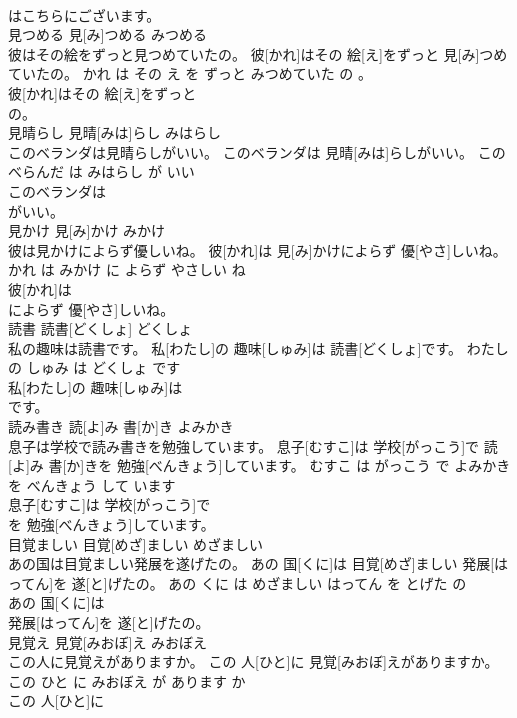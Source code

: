 \documentclass[8pt]{extreport}
\begin{document}
\begin{CJK}{UTF8}{min}
\\	はこちらにございます。			
\\	見つめる	見[み]つめる	みつめる	
\\	彼はその絵をずっと見つめていたの。	彼[かれ]はその 絵[え]をずっと 見[み]つめていたの。	かれ は その え を ずっと みつめていた の 。	
\\	彼[かれ]はその 絵[え]をずっと
\\	の。			
\\	見晴らし	見晴[みは]らし	みはらし	
\\	このベランダは見晴らしがいい。	このベランダは 見晴[みは]らしがいい。	この べらんだ は みはらし が いい	
\\	このベランダは
\\	がいい。			
\\	見かけ	見[み]かけ	みかけ	
\\	彼は見かけによらず優しいね。	彼[かれ]は 見[み]かけによらず 優[やさ]しいね。	かれ は みかけ に よらず やさしい ね	
\\	彼[かれ]は
\\	によらず 優[やさ]しいね。			
\\	読書	読書[どくしょ]	どくしょ	
\\	私の趣味は読書です。	私[わたし]の 趣味[しゅみ]は 読書[どくしょ]です。	わたし の しゅみ は どくしょ です	
\\	私[わたし]の 趣味[しゅみ]は
\\	です。			
\\	読み書き	読[よ]み 書[か]き	よみかき	
\\	息子は学校で読み書きを勉強しています。	息子[むすこ]は 学校[がっこう]で 読[よ]み 書[か]きを 勉強[べんきょう]しています。	むすこ は がっこう で よみかき を べんきょう して います	
\\	息子[むすこ]は 学校[がっこう]で
\\	を 勉強[べんきょう]しています。			
\\	目覚ましい	目覚[めざ]ましい	めざましい	
\\	あの国は目覚ましい発展を遂げたの。	あの 国[くに]は 目覚[めざ]ましい 発展[はってん]を 遂[と]げたの。	あの くに は めざましい はってん を とげた の	
\\	あの 国[くに]は
\\	発展[はってん]を 遂[と]げたの。			
\\	見覚え	見覚[みおぼ]え	みおぼえ	
\\	この人に見覚えがありますか。	この 人[ひと]に 見覚[みおぼ]えがありますか。	この ひと に みおぼえ が あります か	
\\	この 人[ひと]に

\end{CJK}
\end{document}
